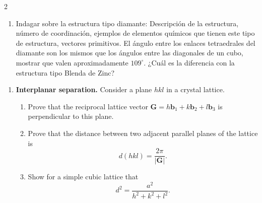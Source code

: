 \documentclass{article}
\begin{document}
\setlength{\columnsep}{2cm}
\begin{multicols}{2} 

\begin{enumerate}[label={{\textcolor{trueblue}{\textbf{Ej}. \arabic*.0}}}, start=1]
    \item Indagar sobre la estructura tipo diamante: Descripción de la estructura, número de coordinación, ejemplos de elementos químicos que tienen este tipo de estructura, vectores primitivos. El ángulo entre los enlaces tetraedrales del diamante son los mismos que los ángulos entre las diagonales de un cubo, mostrar que valen aproximadamente $109^\circ$. ¿Cuál es la diferencia con la estructura tipo Blenda de Zinc?
\end{enumerate}

\begin{enumerate}[label={{\textcolor{trueblue}{\textbf{Ej}. \arabic*.0}}}, start=2]
    \item \textbf{Interplanar separation.} Consider a plane $hkl$ in a crystal lattice. 
    \begin{enumerate}[label=(\alph*)]
        \item Prove that the reciprocal lattice vector $\mathbf{G} = h \mathbf{b}_1 + k \mathbf{b}_2 + l \mathbf{b}_3$ is perpendicular to this plane. 
        \item Prove that the distance between two adjacent parallel planes of the lattice is 
        \[
        d(hkl) = \frac{2\pi}{|\mathbf{G}|}.
        \]
        \item Show for a simple cubic lattice that 
        \[
        d^2 = \frac{a^2}{h^2+k^2+l^2}.
        \]
    \end{enumerate}
\end{enumerate}


\end{multicols}
\end{document}
